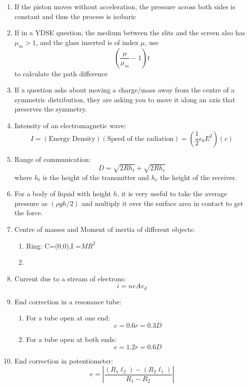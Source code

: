 \documentclass{article}
\numberwithin{equation}{section}
\numberwithin{figure}{section}
\begin{document}
\begin{enumerate}
	\item If the piston moves without acceleration, the pressure across both sides is constant and thus the process is isobaric
	\item If in a YDSE question, the medium between the slits and the screen also has $\mu_{m}>1$, and the glass inserted is of index $\mu$, use $$\left(\dfrac{\mu}{\mu_m}-1\right)t$$ to calculate the path difference
	\item If a question asks about moving a charge/mass away from the centre of a symmetric distribution, they are asking you to move it along an axis that preserves the symmetry.
	\item Intensity of an electromagnetic wave:
		\begin{equation}
			I=(\text{Energy Density})(\text{Speed of the radiation})=\left(\frac{1}{2}\epsilon_0 E^2\right)(c)
		\end{equation}
	\item Range of communication:
		\begin{equation}
			D=\sqrt{2R h_{t}}+\sqrt{2R h_{r}}
		\end{equation}
		where $h_t$ is the height of the transmitter and $h_r$ the height of the receiver.
	\item For a body of liquid with height $h$, it is very useful to take the average pressure as $(\rho gh/2)$ and multiply it over the surface area in contact to get the force.
	\item Centre of masses and Moment of inertia of different objects:
		\begin{enumerate}
			\item Ring: C=(0,0),I =$MR^2$
			\item
		\end{enumerate}
	\item Current due to a stream of electrons:
		\begin{equation}
			i=ne A v_{d}	
		\end{equation}
	\item End correction in a resonance tube:
		\begin{enumerate}
			\item For a tube open at one end: $$e=0.6 r=0.3 D$$
			\item For a tube open at both ends: $$e=1.2 r=0.6 D$$
		\end{enumerate}
	\item End correction in potentiometer:
		\begin{equation}
		e=\left | \frac{(R_1\ell_2)-(R_2\ell_1)}{R_1-R_2}\right |

\end{equation}
\end{enumerate}
\end{document}
